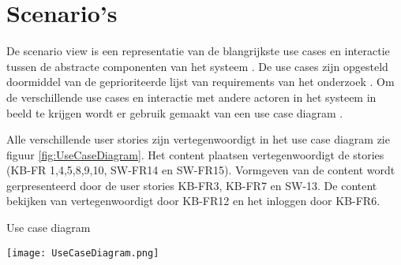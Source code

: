 \section{Scenario's}
De scenario view is een representatie van de blangrijkste use cases en interactie tussen de abstracte componenten van het systeem \parencite{4+1ViewModelPaper}.
De use cases zijn opgesteld doormiddel van de geprioriteerde lijst van requirements van het onderzoek \parencite{DanteOnderzoek}.
Om de verschillende use cases en interactie met andere actoren in het systeem in beeld te krijgen wordt er gebruik gemaakt van een use case diagram \parencite{UseCaseDiagram}.

\whitespace
Alle verschillende user stories zijn vertegenwoordigt in het use case diagram zie figuur \ref{fig:UseCaseDiagram}.
Het content plaatsen vertegenwoordigt de stories (KB-FR 1,4,5,8,9,10, SW-FR14 en SW-FR15).
Vormgeven van de content wordt gerpresenteerd door de user stories KB-FR3, KB-FR7 en SW-13.
De content bekijken van vertegenwoordigt door KB-FR12 en het inloggen door KB-FR6.

\whitespace[2]
\begin{graphic}
	\captionsetup{type=figure}
	\caption{Use case diagram}
	\texttt{[image: UseCaseDiagram.png]}
	\label{fig:UseCaseDiagram}
\end{graphic}

